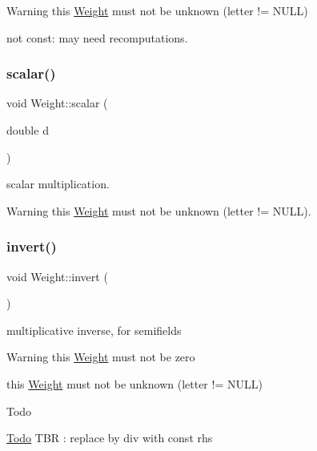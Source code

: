 \begin{DoxyWarning}{Warning}
this \mbox{\hyperlink{classWeight}{Weight}} must not be unknown (letter != N\+U\+LL) 

not const\+: may need recomputations. 
\end{DoxyWarning}
\mbox{\label{group__weight_ga5d63ead0a1d21ee5628c643fca773903}} 
\subsubsection{\texorpdfstring{scalar()}{scalar()}}
{\footnotesize\ttfamily void Weight\+::scalar (\begin{DoxyParamCaption}\item[{double}]{d }\end{DoxyParamCaption})}



scalar multiplication. 

\begin{DoxyWarning}{Warning}
this \mbox{\hyperlink{classWeight}{Weight}} must not be unknown (letter != N\+U\+LL). 
\end{DoxyWarning}
\mbox{\label{group__weight_gabc3309e134f0fdda38ebbcb12d350a28}} 
\subsubsection{\texorpdfstring{invert()}{invert()}\hspace{0.1cm}{\footnotesize\ttfamily [4/4]}}
{\footnotesize\ttfamily void Weight\+::invert (\begin{DoxyParamCaption}{ }\end{DoxyParamCaption})}



multiplicative inverse, for semifields 

\begin{DoxyWarning}{Warning}
this \mbox{\hyperlink{classWeight}{Weight}} must not be zero 

this \mbox{\hyperlink{classWeight}{Weight}} must not be unknown (letter != N\+U\+LL)
\end{DoxyWarning}
\begin{DoxyRefDesc}{Todo}
\item[\mbox{\hyperlink{todo__todo000040}{Todo}}]T\+BR \+: replace by div with const rhs \end{DoxyRefDesc}
\mbox{\label{group__weight_gaace5b230ea1544aac7b049091e142bd3}} 
